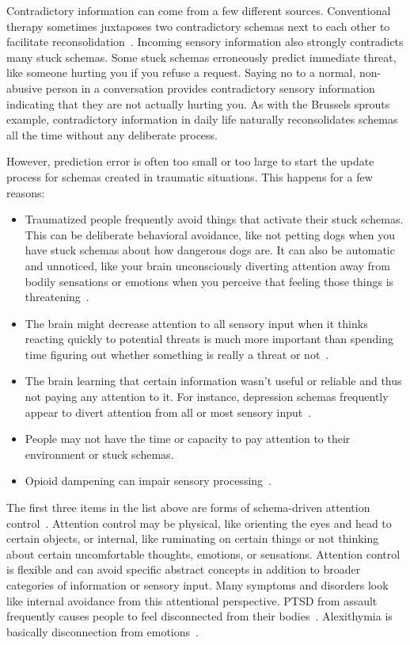 \documentclass[11pt,oneside]{book}
\let\cite\parencite
\begin{document}
Contradictory information can come from a few different sources. Conventional therapy sometimes juxtaposes two contradictory schemas next to each other to facilitate reconsolidation~\cite{eckerUnlocking}. Incoming sensory information also strongly contradicts many stuck schemas. Some stuck schemas erroneously predict immediate threat, like someone hurting you if you refuse a request. Saying no to a normal, non-abusive person in a conversation provides contradictory sensory information indicating that they are not actually hurting you. As with the Brussels sprouts example, contradictory information in daily life naturally reconsolidates schemas all the time without any deliberate process.

\label{attention}
However, prediction error is often too small or too large to start the update process for schemas created in traumatic situations. This happens for a few reasons:
\begin{itemize}
    \item Traumatized people frequently avoid things that activate their stuck schemas. This can be deliberate behavioral avoidance, like not petting dogs when you have stuck schemas about how dangerous dogs are. It can also be automatic and unnoticed, like your brain unconsciously diverting attention away from bodily sensations or emotions when you perceive that feeling those things is threatening~\cite{clark2015surfing}.
    \item The brain might decrease attention to all sensory input when it thinks reacting quickly to potential threats is much more important than spending time figuring out whether something is really a threat or not~\cite{berghBSTS}.
    \item The brain learning that certain information wasn't useful or reliable and thus not paying any attention to it. For instance, depression schemas frequently appear to divert attention from all or most sensory input~\cite{alexanderPrecision}.
    \item People may not have the time or capacity to pay attention to their environment or stuck schemas.
    \item Opioid dampening can impair sensory processing~\cite{cheetahSigns}.
\end{itemize}
 
The first three items in the list above are forms of schema-driven attention control~\cite{clark2015surfing}. Attention control may be physical, like orienting the eyes and head to certain objects, or internal, like ruminating on certain things or not thinking about certain uncomfortable thoughts, emotions, or sensations. Attention control is flexible and can avoid specific abstract concepts in addition to broader categories of information or sensory input. Many symptoms and disorders look like internal avoidance from this attentional perspective. PTSD from assault frequently causes people to feel disconnected from their bodies~\cite{vanderKolkBody}. Alexithymia is basically disconnection from emotions~\cite{hogeveen2021alexithymia}.
\end{document}
